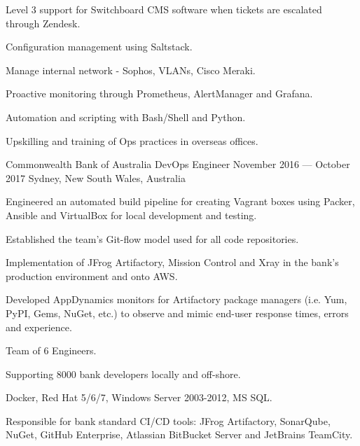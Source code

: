 \begin{cventries}
{\begin{cvitems}
      \item {Level 3 support for Switchboard CMS software when tickets are escalated through Zendesk.}
      \item {Configuration management using Saltstack.}
      \item {Manage internal network - Sophos, VLANs, Cisco Meraki.}
      \item {Proactive monitoring through Prometheus, AlertManager and Grafana.}
      \item {Automation and scripting with Bash/Shell and Python.}
      \item {Upskilling and training of Ops practices in overseas offices.}
    \end{cvitems}
  }

  \cventry
  {Commonwealth Bank of Australia} %
  {DevOps Engineer} %
  {November 2016 --- October 2017} %
  {Sydney, New South Wales, Australia} %
  {
    \begin{cvitems}
      \item {Engineered an automated build pipeline for creating Vagrant boxes using Packer, Ansible and VirtualBox for local development and testing.}
      \item {Established the team's Git-flow model used for all code repositories.}
      \item {Implementation of JFrog Artifactory, Mission Control and Xray in the bank's production environment and onto AWS.}
      \item {Developed AppDynamics monitors for Artifactory package managers (i.e. Yum, PyPI, Gems, NuGet, etc.) to observe and mimic end-user response times, errors and experience.}    \end{cvitems}
  }
  {
    \begin{cvitems}
      \item {Team of 6 Engineers.}
      \item {Supporting 8000 bank developers locally and off-shore.}
      \item {Docker, Red Hat 5/6/7, Windows Server 2003-2012, MS SQL.}
    \end{cvitems}
  }
  {
    \begin{cvitems}
      \item {Responsible for bank standard CI/CD tools: JFrog Artifactory, SonarQube, NuGet, GitHub Enterprise, Atlassian BitBucket Server and JetBrains TeamCity.}

\end{cvitems}}
\end{cventries}
